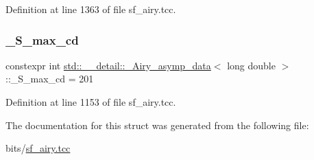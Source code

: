 Definition at line 1363 of file sf\+\_\+airy.\+tcc.

\mbox{\label{structstd_1_1____detail_1_1__Airy__asymp__data_3_01long_01double_01_4_a6a21ac69ffc53d33ebc346981bc52b9a}} 
\subsubsection{\texorpdfstring{\+\_\+\+S\+\_\+max\+\_\+cd}{\_S\_max\_cd}}
{\footnotesize\ttfamily constexpr int \hyperlink{structstd_1_1____detail_1_1__Airy__asymp__data}{std\+::\+\_\+\+\_\+detail\+::\+\_\+\+Airy\+\_\+asymp\+\_\+data}$<$ long double $>$\+::\+\_\+\+S\+\_\+max\+\_\+cd = 201\hspace{0.3cm}{\ttfamily [static]}}



Definition at line 1153 of file sf\+\_\+airy.\+tcc.



The documentation for this struct was generated from the following file\+:\begin{DoxyCompactItemize}
\item 
bits/\hyperlink{sf__airy_8tcc}{sf\+\_\+airy.\+tcc}\end{DoxyCompactItemize}
